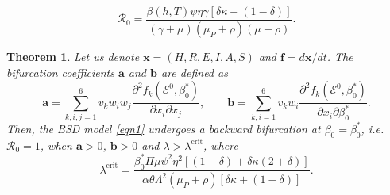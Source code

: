 \documentclass[10pt,a4paper]{amsart}
\newtheorem{thm}{Theorem}
\newcommand\bfa{\mathbf{a}}
\newcommand\bfb{\mathbf{b}}
\newcommand\bff{\mathbf{f}}
\newcommand\bfx{\mathbf{x}}
\begin{document}
\begin{equation}\label{eqn5}
    \mathcal{R}_0=\frac{\beta(h,T)\psi\eta\gamma[\delta\kappa+(1-\delta)]}{(\gamma+\mu)(\mu_P+\rho)(\mu+\rho)}.
\end{equation}

\begin{thm}
    Let us denote $\bfx=(H,R,E,I,A,S)$ and $\bff=d\bfx/dt$. The bifurcation coefficients $\bfa$ and $\bfb$ are defined as
    \begin{equation*}
        \bfa=\sum_{k,i,j=1}^{6}v_kw_iw_j\frac{\partial^2f_k(\mathcal{E}^0,\beta_0^*)}{\partial x_i\partial x_j},\qquad
        \bfb=\sum_{k,i=1}^{6}v_kw_i\frac{\partial^2f_k(\mathcal{E}^0,\beta_0^*)}{\partial x_i\partial\beta_0^*}.
    \end{equation*}
    Then, the BSD model \eqref{eqn1} undergoes a backward bifurcation at $\beta_0=\beta_0^*$, i.e. $\mathcal{R}_0=1$, when $\bfa>0$, $\bfb>0$ and $\lambda>\lambda^{\text{crit}}$, where
    \begin{equation}
        \lambda^{\text{crit}}=\frac{\beta_0^*\Pi\mu\psi^2\eta^2[(1-\delta)+\delta\kappa(2+\delta)]}{\alpha\theta\Lambda^2(\mu_P+\rho)[\delta\kappa+(1-\delta)]}.
    \end{equation}
\end{thm}
\end{document}

